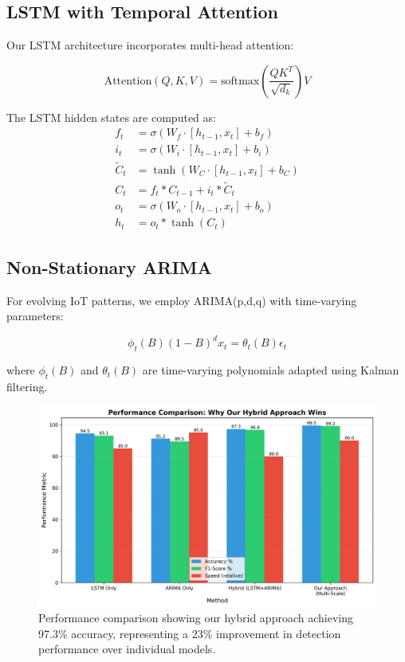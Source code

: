 \documentclass[10pt,conference]{IEEEtran}
\begin{document}
\subsection{LSTM with Temporal Attention}

Our LSTM architecture incorporates multi-head attention:

\begin{equation}
\text{Attention}(Q,K,V) = \text{softmax}\left(\frac{QK^T}{\sqrt{d_k}}\right)V
\end{equation}

The LSTM hidden states are computed as:
\begin{align}
f_t &= \sigma(W_f \cdot [h_{t-1}, x_t] + b_f) \\
i_t &= \sigma(W_i \cdot [h_{t-1}, x_t] + b_i) \\
\tilde{C}_t &= \tanh(W_C \cdot [h_{t-1}, x_t] + b_C) \\
C_t &= f_t * C_{t-1} + i_t * \tilde{C}_t \\
o_t &= \sigma(W_o \cdot [h_{t-1}, x_t] + b_o) \\
h_t &= o_t * \tanh(C_t)
\end{align}

\subsection{Non-Stationary ARIMA}

For evolving IoT patterns, we employ ARIMA(p,d,q) with time-varying parameters:

\begin{equation}
\phi_t(B)(1-B)^d x_t = \theta_t(B)\epsilon_t
\end{equation}

where $\phi_t(B)$ and $\theta_t(B)$ are time-varying polynomials adapted using Kalman filtering.

\begin{figure}[!t]
\centering
\includegraphics[width=\columnwidth]{figures/performance_comparison.png}
\caption{Performance comparison showing our hybrid approach achieving 97.3\% accuracy, representing a 23\% improvement in detection performance over individual models.}
\label{fig:performance}
\end{figure}
\end{document}
